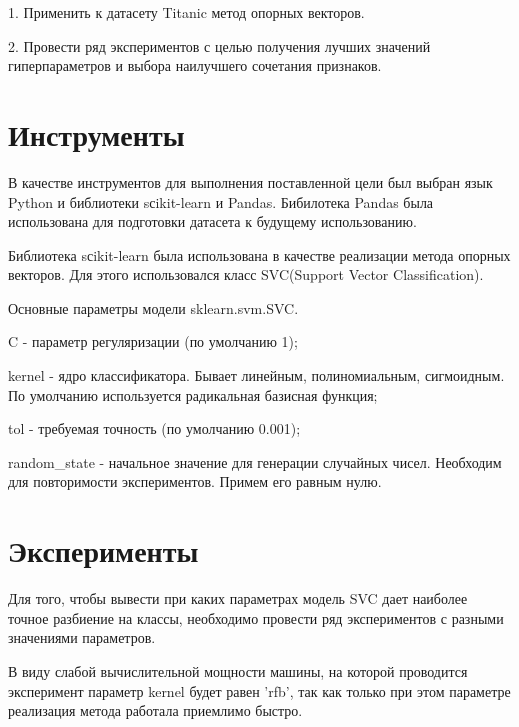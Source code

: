 \documentclass[a4paper,12pt]{article}
\begin{document}
	\vspace{0.5cm}
	1. Применить к датасету Titanic метод опорных векторов.
	
	\vspace{0.5cm}
	2. Провести ряд экспериментов с целью получения лучших значений гиперпараметров и выбора наилучшего сочетания признаков.
	
\newpage\section{Инструменты} 
	В качестве инструментов для выполнения поставленной цели был выбран язык Python и библиотеки sсikit-learn и Pandas.
	Бибилотека Pandas была использована для подготовки датасета к будущему использованию.
	
	\vspace{0.5cm}
	Библиотека sсikit-learn была использована  в качестве реализации метода опорных векторов. Для этого использовался класс SVC(Support Vector Classification).  
	
	\vspace{0.5cm}
	Основные параметры модели sklearn.svm.SVC.
	
	\vspace{0.5cm}
	C - параметр регуляризации (по умолчанию 1);
	
	\vspace{0.5cm}
	kernel - ядро классификатора. Бывает линейным, полиномиальным, сигмоидным. По умолчанию используется радикальная базисная функция;
	
	\vspace{0.5cm}
	tol - требуемая точность (по умолчанию 0.001);
	
	\vspace{0.5cm}
	random\_state - начальное значение для генерации случайных чисел. Необходим для повторимости экспериментов. Примем его равным нулю.


	
\newpage\section{Эксперименты}
	Для того, чтобы вывести при каких параметрах модель SVC дает наиболее точное разбиение на классы, необходимо провести ряд экспериментов с разными значениями параметров. 
	
	\vspace{0.5cm}
	В виду слабой вычислительной мощности машины, на которой проводится эксперимент параметр  kernel будет равен 'rfb', так как только при этом параметре реализация метода работала приемлимо быстро.
	
\end{document}
